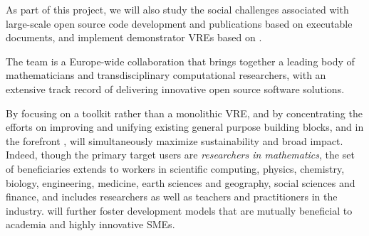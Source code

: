 As part of this project, we will also study the social challenges
associated with large-scale open source code development and 
publications based on executable documents, and implement
demonstrator VREs based on \TheProject.

The \TheProject team is a Europe-wide collaboration that brings
together a leading body of mathematicians and transdisciplinary
computational researchers, with an extensive track record of
delivering innovative open source software solutions.

By focusing on a toolkit rather than a monolithic VRE, and by
concentrating the efforts on improving and unifying existing general
purpose building blocks, and in the forefront \Jupyter, \TheProject
will simultaneously maximize sustainability and broad impact. Indeed,
though the primary target users are \emph{researchers in
  mathematics}, the set of beneficiaries extends to workers in scientific
computing, physics, chemistry, biology, engineering, medicine, earth
sciences and geography, social sciences and finance, and includes researchers as well as teachers
and practitioners in the industry. \TheProject will further foster
development models that are mutually beneficial to academia and highly
innovative SMEs.






\clearpage


